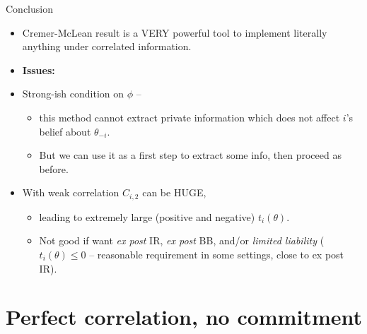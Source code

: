 \documentclass[english,10pt
,aspectratio=169
]{beamer}
\begin{document}
\begin{frame}{Conclusion}
\begin{itemize}
	\item Cremer-McLean result is a VERY powerful tool to implement literally anything under correlated information.
	\item \textbf{Issues:}
	\item Strong-ish condition on $\phi$ --
	\begin{itemize}
		\item this method cannot extract private information which does not affect $i$'s belief about $\theta_{-i}$.
		\item But we can use it as a first step to extract some info, then proceed as before.
	\end{itemize}
	\item With weak correlation $C_{i,2}$ can be HUGE,
	\begin{itemize}
		\item leading to extremely large (positive and negative) $t_i(\theta)$.
		\item Not good if want \emph{ex post} IR, \emph{ex post} BB, and/or \emph{limited liability} ($t_i(\theta)\leq 0$ -- reasonable requirement in some settings, close to ex post IR).
	\end{itemize}
\end{itemize}
\end{frame}


\section{Perfect correlation, no commitment}
\end{document}
